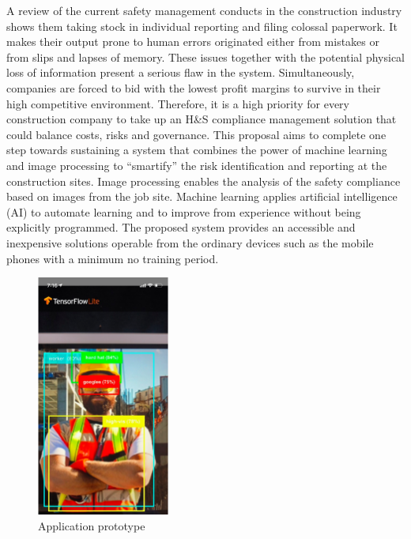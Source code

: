 \documentclass{article}
\begin{document}
A review of the current safety management conducts in the construction industry shows them taking stock in individual reporting and filing colossal paperwork.
It makes their output prone to human errors originated either from mistakes or from slips and lapses of memory.
These issues together with the potential physical loss of information present a serious flaw in the system.
Simultaneously, companies are forced to bid with the lowest profit margins to survive in their high competitive environment. 
Therefore, it is a high priority for every construction company to take up an H\&S compliance management solution that could balance costs, risks and governance.
This proposal aims to complete one step towards sustaining a system that combines the power of machine learning and image processing to ``smartify'' the risk identification and reporting at the construction sites. Image processing enables the analysis of the safety compliance based on images from the job site.
Machine learning applies artificial intelligence (AI) to automate learning and to improve from experience without being explicitly programmed.
The proposed system provides an accessible and inexpensive solutions operable from the ordinary devices such as the mobile phones with a minimum no training period.

\begin{figure}[htbp]
\centering
\includegraphics[height=300]{./Images/fig_02.png}
\caption{\label{fig:org5a11501}Application prototype}
\end{figure}
\end{document}
